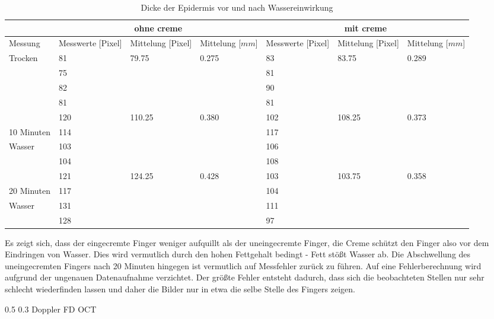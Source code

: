 \documentclass[german, %
parskip=full, %
bibliography=totoc, %
]{scrartcl}
\makeatletter
\renewcommand\subsection{\@startsection 
   {subsection}{2}{0mm}%
   {0.5\baselineskip}%
   {0.3\baselineskip}%
   {\bfseries\sffamily\large}%
   }
\makeatother
\begin{document}
\begin{table}[ht]
\centering
\begin{tabular}[h]{p{2cm}|p{2cm}|p{2cm}|p{2cm}|p{2cm}|p{2cm}|p{2cm}}
& \multicolumn{3}{c|}{ohne creme} & \multicolumn{3}{c}{mit creme} \\ \hline
Messung & Messwerte [Pixel] & Mittelung [Pixel] & Mittelung [$mm$] & Messwerte [Pixel] & Mittelung [Pixel] & Mittelung [$mm$]\\ \hline
\multirow{4}{*}{Trocken} & 81 & \multirow{4}{*}{79.75} & \multirow{4}{*}{0.275} & 83 & \multirow{4}{*}{83.75} & \multirow{4}{*}{0.289} \\
& 75 & & & 81 & & \\
& 82 & & & 90 & & \\
& 81 & & & 81 & & \\ \hline
& 120 & \multirow{4}{*}{110.25} & \multirow{4}{*}{0.380} & 102 & \multirow{4}{*}{108.25} & \multirow{4}{*}{0.373} \\
10 Minuten & 114 & & & 117 & & \\
Wasser & 103 & & & 106 & & \\
& 104 & & & 108 & & \\ \hline
& 121 & \multirow{4}{*}{124.25} & \multirow{4}{*}{0.428} & 103 & \multirow{4}{*}{103.75} & \multirow{4}{*}{0.358} \\
20 Minuten & 117 & & & 104 & & \\
Wasser & 131 & & & 111 & & \\
& 128 & & & 97 & & \\ \hline
\end{tabular}
\caption{Dicke der Epidermis vor und nach Wassereinwirkung}
\label{tab:finger}
\end{table}

Es zeigt sich, dass der eingecremte Finger weniger aufquillt als der uneingecremte Finger, die Creme schützt den Finger also vor dem Eindringen von Wasser. Dies wird vermutlich durch den hohen Fettgehalt bedingt - Fett stößt Wasser ab. Die Abschwellung des uneingecremten Fingers nach 20 Minuten hingegen ist vermutlich auf Messfehler zurück zu führen.
Auf eine Fehlerberechnung wird aufgrund der ungenauen Datenaufnahme verzichtet. Der größte Fehler entsteht dadurch, dass sich die beobachteten Stellen nur sehr schlecht wiederfinden lassen und daher die Bilder nur in etwa die selbe Stelle des Fingers zeigen.

\subsection{Doppler FD OCT}
\end{document}
